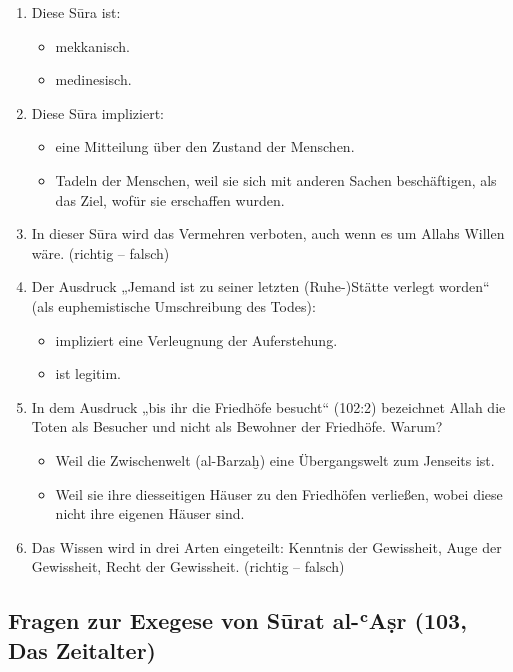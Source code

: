 \begin{enumerate}[leftmargin=1.6em,resume]
\item Diese Sūra ist:
  \begin{itemize}
    \item mekkanisch. \item medinesisch.
  \end{itemize}
\item Diese Sūra impliziert:
  \begin{itemize}
    \item eine Mitteilung über den Zustand der Menschen.
    \item Tadeln der Menschen, weil sie sich mit anderen Sachen beschäftigen, als das Ziel,
      wofür sie erschaffen wurden.
  \end{itemize}
\item In dieser Sūra wird das Vermehren verboten, auch wenn es um Allahs Willen wäre.
  (richtig -- falsch)
\item Der Ausdruck „Jemand ist zu seiner letzten (Ruhe-)Stätte verlegt worden“ (als
  euphemistische Umschreibung des Todes):
  \begin{itemize}
    \item impliziert eine Verleugnung der Auferstehung. \item ist legitim.
  \end{itemize}
\item In dem Ausdruck „bis ihr die Friedhöfe besucht“ (102:2) bezeichnet Allah die Toten als
  Besucher und nicht als Bewohner der Friedhöfe. Warum?
  \begin{itemize}
    \item Weil die Zwischenwelt (al-Barzaḫ) eine Übergangswelt zum Jenseits ist.
    \item Weil sie ihre diesseitigen Häuser zu den Friedhöfen verließen, wobei diese nicht ihre
      eigenen Häuser sind.
  \end{itemize}
\item Das Wissen wird in drei Arten eingeteilt: Kenntnis der Gewissheit, Auge der Gewissheit,
  Recht der Gewissheit. (richtig -- falsch)
\end{enumerate}

\subsection*{Fragen zur Exegese von Sūrat al-ʿAṣr (103, Das Zeitalter)}

